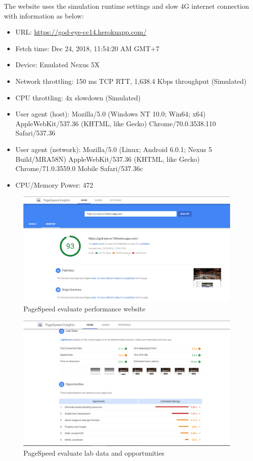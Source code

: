 The website uses the simulation runtime settings and slow 4G internet connection with information as below:
\begin{itemize}
	\item URL: \href{http://god-eye-cc14.herokuapp.com/}{https://god-eye-cc14.herokuapp.com/}
	\item Fetch time: Dec 24, 2018,  11:54:20 AM GMT+7
	\item Device: Emulated Nexus 5X
	\item Network throttling: 150 ms TCP RTT, 1,638.4 Kbps throughput (Simulated)
	\item CPU throttling: 4x slowdown (Simulated)
	\item User agent (host): Mozilla/5.0 (Windows NT 10.0; Win64; x64) AppleWebKit/537.36 (KHTML, like Gecko) Chrome/70.0.3538.110 Safari/537.36
	\item User agent (network): Mozilla/5.0 (Linux; Android 6.0.1; Nexus 5 Build/MRA58N) AppleWebKit/537.36 (KHTML, like Gecko) Chrome/71.0.3559.0 Mobile Safari/537.36c
	\item CPU/Memory Power: 472
\end{itemize}
\begin{center}
	\begin{figure}[H]
		\centering
		\includegraphics[width=1\columnwidth]{images/chap5/pagespeed1.PNG}
		\caption{PageSpeed evaluate performance website}
	\end{figure}
\end{center}
\begin{center}
	\begin{figure}[H]
		\centering
		\includegraphics[width=1\columnwidth]{images/chap5/pagespeed2.PNG}
		\caption{PageSpeed evaluate lab data and opportunities}
	\end{figure}
\end{center}
